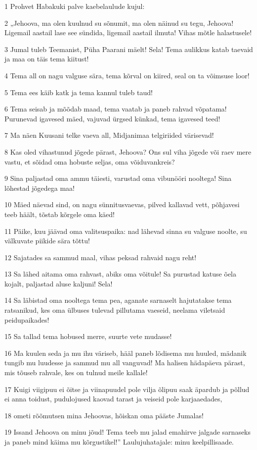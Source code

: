 \par 1 Prohvet Habakuki palve kaebelaulude kujul:
\par 2 „Jehoova, ma olen kuulnud su sõnumit, ma olen näinud su tegu, Jehoova! Ligemail aastail lase see sündida, ligemail aastail ilmuta! Vihas mõtle halastusele!
\par 3 Jumal tuleb Teemanist, Püha Paarani mäelt! Sela! Tema aulikkus katab taevaid ja maa on täis tema kiitust!
\par 4 Tema all on nagu valguse sära, tema kõrval on kiired, seal on ta võimsuse loor!
\par 5 Tema ees käib katk ja tema kannul tuleb taud!
\par 6 Tema seisab ja mõõdab maad, tema vaatab ja paneb rahvad võpatama! Purunevad igavesed mäed, vajuvad ürgsed künkad, tema igavesed teed!
\par 7 Ma näen Kuusani telke vaeva all, Midjanimaa telgiriided värisevad!
\par 8 Kas oled vihastunud jõgede pärast, Jehoova? Ons sul viha jõgede või raev mere vastu, et sõidad oma hobuste seljas, oma võiduvankreis?
\par 9 Sina paljastad oma ammu täiesti, varustad oma vibunööri nooltega! Sina lõhestad jõgedega maa!
\par 10 Mäed näevad sind, on nagu sünnitusvaevas, pilved kallavad vett, põhjavesi teeb häält, tõstab kõrgele oma käed!
\par 11 Päike, kuu jäävad oma valitsuspaika: nad lähevad sinna su valguse noolte, su välkuvate piikide sära tõttu!
\par 12 Sajatades sa sammud maal, vihas peksad rahvaid nagu reht!
\par 13 Sa lähed aitama oma rahvast, abiks oma võitule! Sa purustad katuse õela kojalt, paljastad aluse kaljuni! Sela!
\par 14 Sa läbistad oma nooltega tema pea, aganate sarnaselt hajutatakse tema ratsanikud, kes oma ülbuses tulevad pillutama vaeseid, neelama viletsaid peidupaikades!
\par 15 Sa tallad tema hobused merre, suurte vete mudasse!
\par 16 Ma kuulen seda ja mu ihu väriseb, hääl paneb lõdisema mu huuled, mädanik tungib mu luudesse ja sammud mu all vanguvad! Ma halisen hädapäeva pärast, mis tõuseb rahvale, kes on tulnud meile kallale!
\par 17 Kuigi viigipuu ei õitse ja viinapuudel pole vilja õlipuu saak äpardub ja põllud ei anna toidust, pudulojused kaovad tarast ja veiseid pole karjaaedades,
\par 18 ometi rõõmutsen mina Jehoovas, hõiskan oma pääste Jumalas!
\par 19 Issand Jehoova on minu jõud! Tema teeb mu jalad emahirve jalgade sarnaseks ja paneb mind käima mu kõrgustikel!” Laulujuhatajale: minu keelpillisaade.




